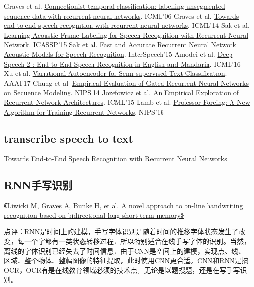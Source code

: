 \documentclass[UTF8,10pt,a4paper]{ctexbook}
\begin{document}
\begin{itemize}
\subitem Graves et al. \href{http://www.cs.toronto.edu/~graves/icml_2006.pdf}{Connectionist temporal classification: labelling unsegmented sequence data with recurrent neural networks}. ICML’06 
\subitem Graves et al. \href{http://www.jmlr.org/proceedings/papers/v32/graves14.pdf}{Towards end-to-end speech recognition with recurrent neural networks}. ICML’14 
\subitem Sak et al. \href{https://wiki.inf.ed.ac.uk/twiki/pub/CSTR/ListenTerm3201415/ctc.pdf}{Learning Acoustic Frame Labeling for Speech Recognition with Recurrent Neural Network}. ICASSP’15 
\subitem Sak et al. \href{http://isca-speech.org/archive/interspeech_2015/papers/i15_1468.pdf}{Fast and Accurate Recurrent Neural Network Acoustic Models for Speech Recognition}. InterSpeech’15 
\subitem Amodei et al. \href{http://jmlr.org/proceedings/papers/v48/amodei16.pdf}{Deep Speech 2 : End-to-End Speech Recognition in English and Mandarin}. ICML’16 
\subitem Xu et al. \href{http://www.cil.pku.edu.cn/publications/papers/2016/XuSunDengTanAAAI2017.pdf}{Variational Autoencoder for Semi-supervised Text Classification}. AAAI’17 
\subitem Chung et al. \href{https://arxiv.org/abs/1412.3555}{Empirical Evaluation of Gated Recurrent Neural Networks on Sequence Modeling}. NIPS’14 
\subitem Jozefowicz et al. \href{http://jmlr.csail.mit.edu/proceedings/papers/v37/jozefowicz15.pdf}{An Empirical Exploration of Recurrent Network Architectures}. ICML’15 
\subitem Lamb et al. \href{https://arxiv.org/abs/1610.09038}{Professor Forcing: A New Algorithm for Training Recurrent Networks}. NIPS’16
\end{itemize}





\subsection{transcribe speech to text}
\href{http://proceedings.mlr.press/v32/graves14.pdf}{Towards End-to-End Speech Recognition with Recurrent Neural Networks}

\subsection{RNN手写识别}
\href{http://www6.in.tum.de/Main/Publications/Liwicki2007a.pdf}{《Liwicki M, Graves A, Bunke H, et al. A novel approach to on-line handwriting recognition based on bidirectional long short-term memory》}

点评：RNN是时间上的建模，手写字体识别是随着时间的推移字体状态发生了改变，每一个字都有一类状态转移过程，所以特别适合在线手写字体的识别。当然，离线的字体识别已经失去了时间信息，由于CNN是空间上的建模，实现点、线、区域、整个物体、整幅图像的特征提取，此时使用CNN更合适。CNN和RNN是搞OCR，OCR有是在线教育领域必须的技术点，无论是以题搜题，还是在写手写识别。
\end{document}
